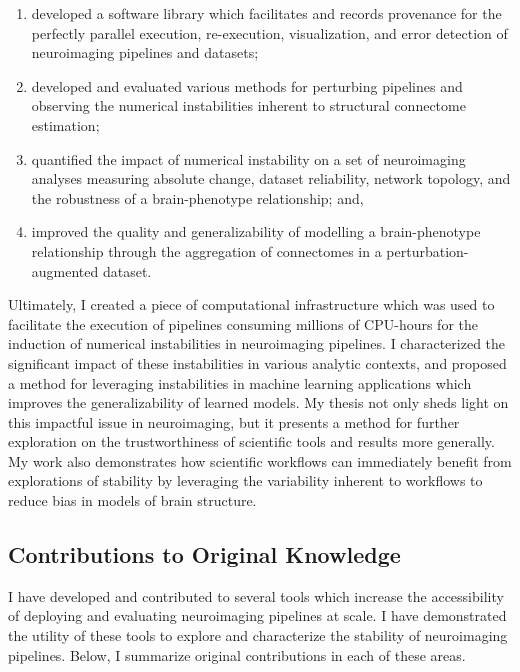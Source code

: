 \begin{enumerate}[label=(\roman*)]
\item developed a software library which facilitates and records provenance for the perfectly parallel execution,
re-execution, visualization, and error detection of neuroimaging pipelines and datasets;
\item developed and evaluated various methods for perturbing pipelines and observing the numerical instabilities
inherent to structural connectome estimation;
\item quantified the impact of numerical instability on a set of neuroimaging analyses measuring absolute change,
dataset reliability, network topology, and the robustness of a brain-phenotype relationship; and,
\item improved the quality and generalizability of modelling a brain-phenotype relationship through the aggregation of
connectomes in a perturbation-augmented dataset.
\end{enumerate}

Ultimately, I created a piece of computational infrastructure which was used to facilitate the execution of pipelines
consuming millions of CPU-hours for the induction of numerical instabilities in neuroimaging pipelines. I characterized
the significant impact of these instabilities in various analytic contexts, and proposed a method for leveraging
instabilities in machine learning applications which improves the generalizability of learned models. My thesis not
only sheds light on this impactful issue in neuroimaging, but it presents a method for further exploration on the
trustworthiness of scientific tools and results more generally. My work also demonstrates how scientific workflows can
immediately benefit from explorations of stability by leveraging the variability inherent to workflows to reduce bias
in models of brain structure.

\subsection{Contributions to Original Knowledge}
I have developed and contributed to several tools which increase the accessibility of deploying and evaluating
neuroimaging pipelines at scale. I have demonstrated the utility of these tools to explore and characterize the
stability of neuroimaging pipelines. Below, I summarize original contributions in each of these areas.

